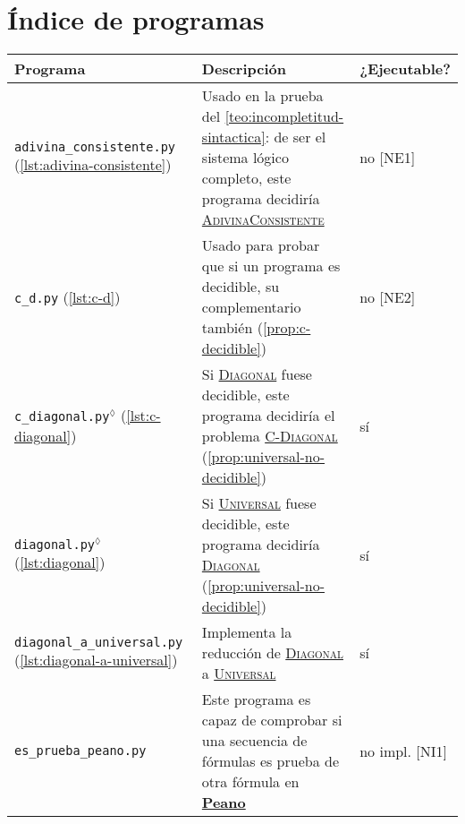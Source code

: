 \section{Índice de programas}

\begin{tabularx}{\textwidth}{L{0.3} L{0.5} L{0.2}}
\midrule
Programa & Descripción & ¿Ejecutable? \\
\midrule
\texttt{adivina\_consistente.py} \linebreak \small{(\cref{lst:adivina-consistente})} & Usado en la prueba del \cref{teo:incompletitud-sintactica}: de ser el sistema lógico completo, este programa decidiría \hyperref[prob:adivina-consistente]{\textsc{AdivinaConsistente}} \vspace{4pt} & no [NE1] \\

\texttt{c\_d.py} \linebreak \small{(\cref{lst:c-d})} & Usado para probar que si un programa es decidible, su complementario también (\cref{prop:c-decidible}) \vspace{4pt} & no [NE2] \\

\texttt{c\_diagonal.py}$^\lozenge$ \linebreak \small{(\cref{lst:c-diagonal})} & Si \hyperref[prob:diagonal]{\textsc{Diagonal}} fuese decidible, este programa decidiría el problema \hyperref[prob:c-diagonal]{\textsc{C-Diagonal}} (\cref{prop:universal-no-decidible}) \vspace{4pt} & sí \\

\texttt{diagonal.py}$^\lozenge$ \linebreak \small{(\cref{lst:diagonal})} & Si \hyperref[prob:universal]{\textsc{Universal}} fuese decidible, este programa decidiría \hyperref[prob:diagonal]{\textsc{Diagonal}} (\cref{prop:universal-no-decidible}) \vspace{4pt} & sí \\

\texttt{diagonal\_a\_universal.py} \linebreak \small{(\cref{lst:diagonal-a-universal})} & Implementa la reducción de \hyperref[prob:diagonal]{\textsc{Diagonal}} a \hyperref[prob:universal]{\textsc{Universal}} \vspace{4pt} & sí \\

\texttt{es\_prueba\_peano.py} & Este programa es capaz de comprobar si una secuencia de fórmulas es prueba de otra fórmula en \hyperref[sl:peano]{\textbf{Peano}} \vspace{4pt} & no impl. [NI1] \\


\end{tabularx}
